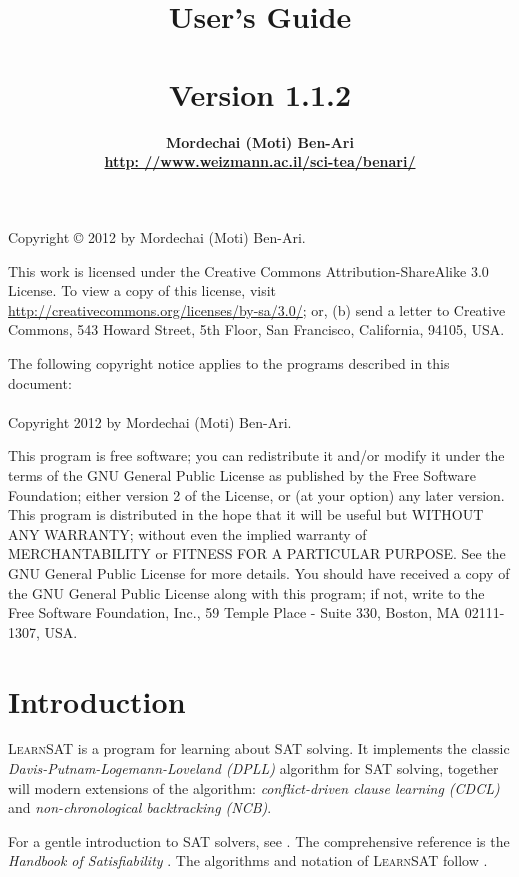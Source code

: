 \documentclass[11pt]{article}
\author{\bfseries Mordechai (Moti) Ben-Ari\\\url{http: //www.weizmann.ac.il/sci-tea/benari/}}
\title{\bfseries \ls\\\mbox{}\\
\bfseries\large User's Guide\\\mbox{}\\
\bfseries\normalsize Version 1.1.2}
\newcommand*{\ls}{\textsc{LearnSAT}}
\begin{document}
\maketitle
\thispagestyle{empty}

\vfill

\begin{center}
Copyright \copyright{} 2012 by Mordechai (Moti) Ben-Ari.
\end{center}
This work is licensed under the Creative Commons Attribution-ShareAlike 3.0
License. To view a copy of this license, visit
\url{http://creativecommons.org/licenses/by-sa/3.0/}; or, (b) send a letter
to Creative Commons, 543 Howard Street, 5th Floor, San Francisco,
California, 94105, USA.

\bigskip

 
\begin{center}
The following copyright notice applies to the programs described in this
document:\mbox{}\\\mbox{}\\
Copyright 2012 by Mordechai (Moti) Ben-Ari.
\end{center}

This program is free software; you can redistribute it and/or
modify it under the terms of the GNU General Public License
as published by the Free Software Foundation; either version 2
of the License, or (at your option) any later version.
This program is distributed in the hope that it will be useful
but WITHOUT ANY WARRANTY; without even the implied warranty of
MERCHANTABILITY or FITNESS FOR A PARTICULAR PURPOSE.
See the GNU General Public License for more details.
You should have received a copy of the GNU General Public License
along with this program; if not, write to the Free Software
Foundation, Inc., 59 Temple Place - Suite 330, Boston, MA
02111-1307, USA.

\newpage

\section{Introduction}

\ls{} is a program for learning about SAT solving. It implements the
classic \emph{Davis-Putnam-Logemann-Loveland (DPLL)} algorithm for SAT
solving, together will modern extensions of the algorithm:
\emph{conflict-driven clause learning (CDCL)} and
\emph{non-chronological backtracking (NCB)}.

For a gentle introduction to SAT solvers, see \cite[Chapter~6]{mlcs}.
The comprehensive reference is the \emph{Handbook of Satisfiability}
\cite{SAT}. The algorithms and notation of \ls{} follow \cite{mlm}.
\end{document}
